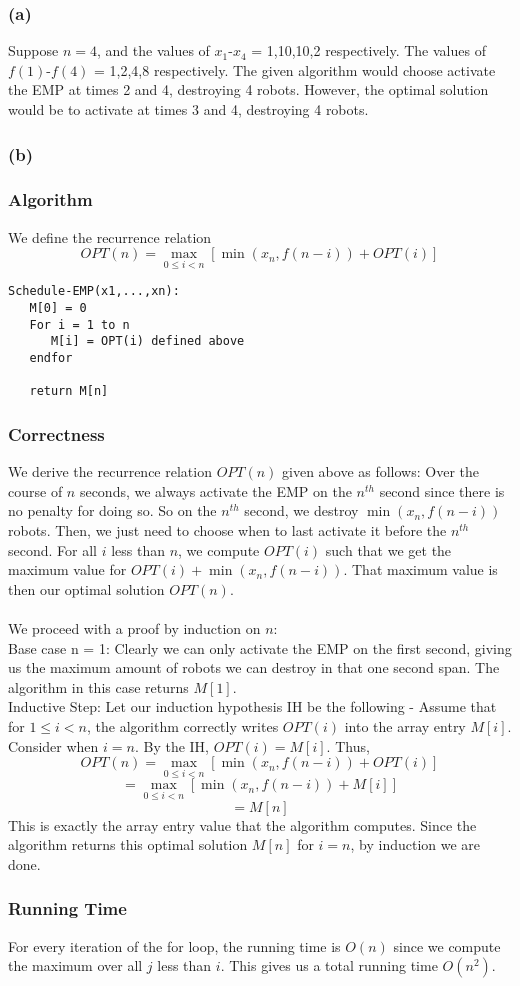 \documentclass[12pt, oneside]{article}
\begin{document}
\subsubsection*{(a)}
Suppose $n=4$, and the values of $x_1$-$x_4$ = 1,10,10,2 respectively. The values of $f(1)$-$f(4)$ = 1,2,4,8 respectively. The given algorithm would choose activate the EMP at times 2 and 4, destroying 4 robots. However, the optimal solution would be to activate at times 3 and 4, destroying 4 robots.

\subsubsection*{(b)}
\subsubsection*{Algorithm}
We define the recurrence relation
\[OPT(n) = \max\limits_{0\leq i < n} [\min(x_n,f(n-i)) + OPT(i)]\]

\begin{verbatim}
Schedule-EMP(x1,...,xn):
   M[0] = 0
   For i = 1 to n
      M[i] = OPT(i) defined above
   endfor
   
   return M[n]
\end{verbatim}

\subsubsection*{Correctness}
We derive the recurrence relation $OPT(n)$ given above as follows: Over the course of $n$ seconds, we always activate the EMP on the $n^{th}$ second since there is no penalty for doing so. So on the $n^{th}$ second, we destroy $\min(x_n,f(n-i))$ robots. Then, we just need to choose when to last activate it before the $n^{th}$ second. For all $i$ less than $n$, we compute $OPT(i)$ such that we get the maximum value for $OPT(i) + \min(x_n,f(n-i))$. That maximum value is then our optimal solution $OPT(n)$.\\\\
We proceed with a proof by induction on $n$:\\
Base case n = 1: Clearly we can only activate the EMP on the first second, giving us the maximum amount of robots we can destroy in that one second span. The algorithm in this case returns $M[1]$.\\
Inductive Step: Let our induction hypothesis IH be the following - Assume that for $1 \leq i < n$, the algorithm correctly writes $OPT(i)$ into the array entry $M[i]$.  \\
Consider when $i = n$. By the IH, $OPT(i) = M[i]$. Thus,
\[OPT(n) = \max\limits_{0\leq i < n} [\min(x_n,f(n-i)) + OPT(i)]\]
\[ = \max\limits_{0\leq i < n} [\min(x_n,f(n-i)) + M[i]] \]
\[ = M[n]\]
This is exactly the array entry value that the algorithm computes. Since the algorithm returns this optimal solution $M[n]$ for $i=n$, by induction we are done.

\subsubsection*{Running Time}
For every iteration of the for loop, the running time is $O(n)$ since we compute the maximum over all $j$ less than $i$. This gives us a total running time $O(n^2)$. 
\end{document}
